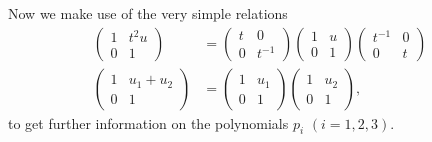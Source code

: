 Now we make use of the very simple relations
\begin{align}
\label{eq:no1a}
\left(\begin{matrix} 1 & t^2u \\ 0 & 1\end{matrix}\right) &=
\left(\begin{matrix} t & 0 \\ 0 & t^{-1}  \end{matrix}\right) 
\left(\begin{matrix} 1 & u \\ 0 & 1 \end{matrix}\right) 
\left(\begin{matrix}  t^{-1} & 0 \\ 0 & t \end{matrix}\right) \\
\label{eq:no2a}
\left(\begin{matrix} 1 & u_1 + u_2 \\ 0 & 1 \end{matrix}\right) &=
\left(\begin{matrix} 1 & u_1 \\ 0 & 1 \end{matrix}\right) 
\left(\begin{matrix} 1 & u_2 \\ 0 & 1 \end{matrix}\right),
\end{align}
to get further information on the polynomials $p_i$ $(i=1,2,3)$.

